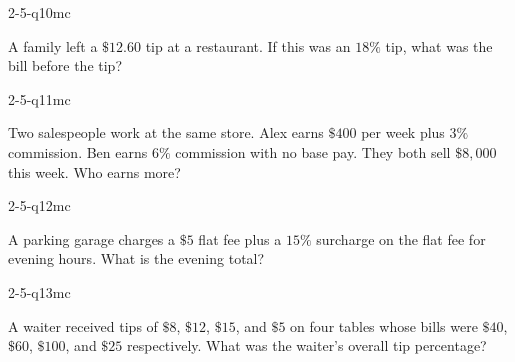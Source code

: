 \begin{practiceQuestion}{2-5-q10}{mc}
\begin{questionText}
A family left a $\$12.60$ tip at a restaurant. If this was an $18\%$ tip, what was the bill before the tip?
\end{questionText}
\end{practiceQuestion}

\begin{practiceQuestion}{2-5-q11}{mc}
\begin{questionText}
Two salespeople work at the same store. Alex earns $\$400$ per week plus $3\%$ commission. Ben earns $6\%$ commission with no base pay. They both sell $\$8{,}000$ this week. Who earns more?
\end{questionText}
\end{practiceQuestion}

\begin{practiceQuestion}{2-5-q12}{mc}
\begin{questionText}
A parking garage charges a $\$5$ flat fee plus a $15\%$ surcharge on the flat fee for evening hours. What is the evening total?
\end{questionText}
\end{practiceQuestion}

\begin{practiceQuestion}{2-5-q13}{mc}
\begin{questionText}
A waiter received tips of $\$8$, $\$12$, $\$15$, and $\$5$ on four tables whose bills were $\$40$, $\$60$, $\$100$, and $\$25$ respectively. What was the waiter's overall tip percentage?
\end{questionText}
\end{practiceQuestion}

